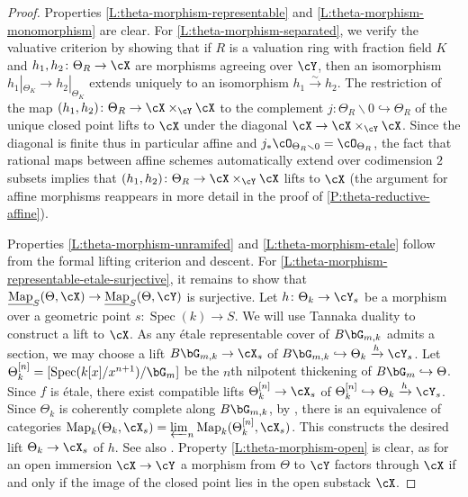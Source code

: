 \documentclass[a4paper]{amsart}
\numberwithin{equation}{section}
\theoremstyle{plain}
\theoremstyle{definition}
\DeclareMathOperator{\Spec}{Spec}
\newcommand{\hookarr}{\hookrightarrow}
\newcommand{\ilim}{\varprojlim}
\newcommand{\uMap}{\underline{{\rm Map}}}
\newcommand{\co}{\colon}
\newcommand{\oh}{\cO}
\newcommand{\iso}{\stackrel{\sim}{\to}}
\DeclareMathOperator{\Map}{Map}
\begin{document}
\begin{proof}
	Properties \ref{L:theta-morphism-representable} and \ref{L:theta-morphism-monomorphism} are clear.  
	For \ref{L:theta-morphism-separated}, we verify the valuative criterion by showing that if $R$ is a valuation ring with fraction field $K$ and $h_1,h_2 \co \Theta_R \to \cX$ are morphisms agreeing over $\cY$, then an isomorphism $h_1|_{\Theta_K} \to h_2|_{\Theta_K}$ extends {uniquely} to an isomorphism $h_1 \iso h_2$.  The restriction of the map $(h_1, h_2) \co \Theta_R \to \cX \times_{\cY} \cX$ to the complement $j \co \Theta_R \smallsetminus 0 \hookrightarrow \Theta_R$ of the unique closed point lifts to $\cX$ under the diagonal $\cX \to \cX \times_{\cY} \cX$.  Since the diagonal is finite {thus in particular affine} and $j_* \oh_{\Theta_R \smallsetminus 0} = \oh_{\Theta_R}$, {the fact that rational maps between affine schemes automatically extend over codimension $2$ subsets implies } that $(h_1, h_2) \co \Theta_R \to \cX \times_{\cY} \cX$ lifts to $\cX$ ({the argument for affine morphisms reappears in more detail in the proof of \eqref{P:theta-reductive-affine}}).
	
	Properties \ref{L:theta-morphism-unramifed} and \ref{L:theta-morphism-etale} follow from the formal lifting criterion and descent.
	For \ref{L:theta-morphism-representable-etale-surjective}, it remains to show that $\uMap_S(\Theta,\cX) \to \uMap_S(\Theta,\cY)$ is surjective.  Let $h \co \Theta_k \to \cY_s$ be a morphism over a geometric point $s\co \Spec(k) \to S$. We will use Tannaka duality to construct a lift to $\cX$.  As any \'etale representable cover of $B\bG_{m,k}$ admits a section, we may choose a lift $B \bG_{m,k} \to \cX_s$ of $B \bG_{m,k} \hookarr \Theta_k \xrightarrow{h} \cY_s$.  
	Let $\Theta^{[n]}_k = [\Spec(k[x]/x^{n+1}) / \bG_m]$ be the $n$th nilpotent thickening of $B\bG_m \hookarr \Theta$.   Since $f$ is \'etale, there exist compatible lifts $\Theta^{[n]}_k \to \cX_s$ of $\Theta^{[n]}_k \hookarr \Theta_k \xrightarrow{h} \cY_s$. Since $\Theta_k$ is coherently complete along $B\bG_{m,k}$, by \cite[Cor.~3.6]{ahr}, there is an equivalence of categories $\Map_k(\Theta_k, \cX_s) = \ilim_n \Map_k(\Theta^{[n]}_k, \cX_s)$.  This constructs the desired lift $\Theta_k \to \cX_s$ of $h$.  See also \cite[Lem.~3.2.10]{hlinstability}. {Property \ref{L:theta-morphism-open} is clear, as for an open immersion $\cX\to \cY$ a morphism from $\Theta$ to $\cY$ factors through $\cX$ if and only if the image of the closed point lies in the open substack $\cX$.}
\end{proof}
\end{document}
